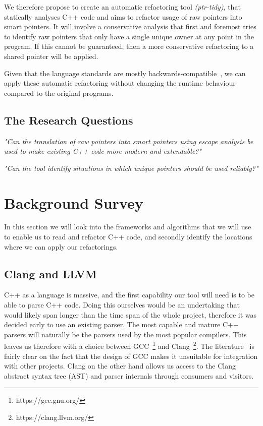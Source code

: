\documentclass{proposal}
\begin{document}
    We therefore propose to create an automatic refactoring tool \emph{(ptr-tidy)}, that statically analyses C++ code and aims to refactor usage of raw pointers into smart pointers.
    It will involve a conservative analysis that first and foremost tries to identify raw pointers that only have a single unique owner at any point in the program.
    If this cannot be guaranteed, then a more conservative refactoring to a shared pointer will be applied.

    Given that the language standards are mostly backwards-compatible~\cite{Winters2020}, we can apply these automatic refactoring without changing the runtime behaviour compared to the original programs.


    \subsection{The Research Questions}\label{subsec:the-research-questions}

    \emph{"Can the translation of raw pointers into smart pointers using escape analysis be used to make existing C++ code more modern and extendable?"}

    \emph{"Can the tool identify situations in which unique pointers should be used reliably?"}




    \section{Background Survey}\label{sec:background-survey}

    In this section we will look into the frameworks and algorithms that we will use to enable us to read and refactor C++ code, and secondly identify the locations where we can apply our refactorings.

    \subsection{Clang and LLVM}\label{subsec:clang-and-llvm}

    C++ as a language is massive, and the first capability our tool will need is to be able to parse C++ code.
    Doing this ourselves would be an undertaking that would likely span longer than the time span of the whole project, therefore it was decided early to use an existing parser.
    The most capable and mature C++ parsers will naturally be the parsers used by the most popular compilers.
    This leaves us therefore with a choice between GCC~\footnote{https://gcc.gnu.org/} and Clang~\footnote{https://clang.llvm.org/}.
    The literature~\cite{duffy2014} is fairly clear on the fact that the design of GCC makes it unsuitable for integration with other projects.
    Clang on the other hand allows us access to the Clang abstract syntax tree (AST) and parser internals through consumers and visitors.
\end{document}
